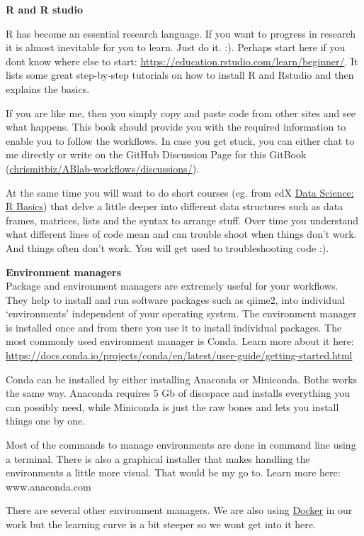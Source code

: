 \documentclass[
]{book}
\begin{document}
\textbf{R and R studio}

R has become an essential research language. If you want to progress in research it is almost inevitable for you to learn. Just do it. :). Perhaps start here if you dont know where else to start: \url{https://education.rstudio.com/learn/beginner/}. It lists some great step-by-step tutorials on how to install R and Rstudio and then explains the basics.

If you are like me, then you simply copy and paste code from other sites and see what happens. This book should provide you with the required information to enable you to follow the workflows. In case you get stuck, you can either chat to me directly or write on the GitHub Discussion Page for this GitBook (\href{(https://github.com/chrismitbiz/ABlab-workflows/discussions/)}{chrismitbiz/ABlab-workflows/discussions/}).

At the same time you will want to do short courses (eg. from edX \href{https://www.edx.org/course/data-science-r-basics}{Data Science: R Basics}) that delve a little deeper into different data structures such as data frames, matrices, lists and the syntax to arrange stuff. Over time you understand what different lines of code mean and can trouble shoot when things don't work. And things often don't work. You will get used to troubleshooting code :).

\textbf{Environment managers}\\
Package and environment managers are extremely useful for your workflows. They help to install and run software packages such as qiime2, into individual `environments' independent of your operating system. The environment manager is installed once and from there you use it to install individual packages. The most commonly used environment manager is Conda. Learn more about it here: \url{https://docs.conda.io/projects/conda/en/latest/user-guide/getting-started.html}

Conda can be installed by either installing Anaconda or Miniconda. Boths works the same way. Anaconda requires 5 Gb of discspace and installs everything you can possibly need, while Miniconda is just the raw bones and lets you install things one by one.

Most of the commands to manage environments are done in command line using a terminal. There is also a graphical installer that makes handling the environments a little more visual. That would be my go to. Learn more here: www.anaconda.com

There are several other environment managers. We are also using \href{https://www.docker.com/}{Docker} in our work but the learning curve is a bit steeper so we wont get into it here.
\end{document}
